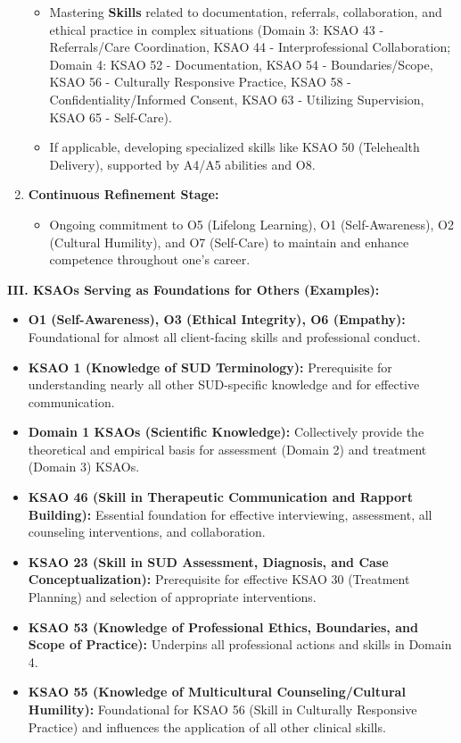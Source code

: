 \documentclass[
  letterpaper,
  DIV=11,
  numbers=noendperiod]{scrartcl}
\providecommand{\tightlist}{%
  \setlength{\itemsep}{0pt}\setlength{\parskip}{0pt}}
\begin{document}
\begin{enumerate}
  \begin{itemize}
  \tightlist
  \item
    Mastering \textbf{Skills} related to documentation, referrals,
    collaboration, and ethical practice in complex situations (Domain 3:
    KSAO 43 - Referrals/Care Coordination, KSAO 44 - Interprofessional
    Collaboration; Domain 4: KSAO 52 - Documentation, KSAO 54 -
    Boundaries/Scope, KSAO 56 - Culturally Responsive Practice, KSAO 58
    - Confidentiality/Informed Consent, KSAO 63 - Utilizing Supervision,
    KSAO 65 - Self-Care).
  \item
    If applicable, developing specialized skills like KSAO 50
    (Telehealth Delivery), supported by A4/A5 abilities and O8.
  \end{itemize}
\item
  \textbf{Continuous Refinement Stage:}

  \begin{itemize}
  \tightlist
  \item
    Ongoing commitment to O5 (Lifelong Learning), O1 (Self-Awareness),
    O2 (Cultural Humility), and O7 (Self-Care) to maintain and enhance
    competence throughout one's career.
  \end{itemize}
\end{enumerate}

\textbf{III. KSAOs Serving as Foundations for Others (Examples):}

\begin{itemize}
\tightlist
\item
  \textbf{O1 (Self-Awareness), O3 (Ethical Integrity), O6 (Empathy):}
  Foundational for almost all client-facing skills and professional
  conduct.
\item
  \textbf{KSAO 1 (Knowledge of SUD Terminology):} Prerequisite for
  understanding nearly all other SUD-specific knowledge and for
  effective communication.
\item
  \textbf{Domain 1 KSAOs (Scientific Knowledge):} Collectively provide
  the theoretical and empirical basis for assessment (Domain 2) and
  treatment (Domain 3) KSAOs.
\item
  \textbf{KSAO 46 (Skill in Therapeutic Communication and Rapport
  Building):} Essential foundation for effective interviewing,
  assessment, all counseling interventions, and collaboration.
\item
  \textbf{KSAO 23 (Skill in SUD Assessment, Diagnosis, and Case
  Conceptualization):} Prerequisite for effective KSAO 30 (Treatment
  Planning) and selection of appropriate interventions.
\item
  \textbf{KSAO 53 (Knowledge of Professional Ethics, Boundaries, and
  Scope of Practice):} Underpins all professional actions and skills in
  Domain 4.
\item
  \textbf{KSAO 55 (Knowledge of Multicultural Counseling/Cultural
  Humility):} Foundational for KSAO 56 (Skill in Culturally Responsive
  Practice) and influences the application of all other clinical skills.
\end{itemize}
\end{document}
